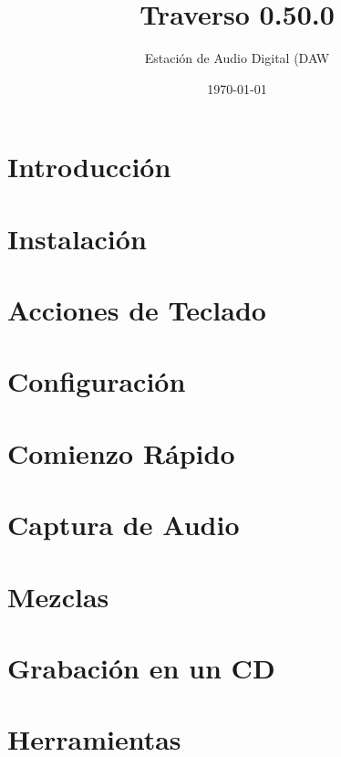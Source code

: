 \documentclass[a4paper,
               12pt,
               pdftex,
               twoside,
               smallheadings,
               headinclude,
               headsepline,
               DIV16,
               BCOR10mm,
               halfparskip
               ]{scrreprt}
\newcommand{\clearemptydoublepage}{\newpage\thispagestyle{empty}\cleardoublepage}
\begin{document}
\title{Traverso 0.50.0}
\author{Estación de Audio Digital (DAW}
\date{\today}

\begin{titlepage}
  
\end{titlepage}
  \clearemptydoublepage
  
  \clearemptydoublepage

\setcounter{page}{1}


\tableofcontents


\chapter{Introducción\label{sect_introduction}}

\chapter{Instalación\label{sect_installation}}

\chapter{Acciones de Teclado\label{sect_keyactions}}

\chapter{Configuración\label{sect_setup}}

\chapter{Comienzo Rápido\label{sect_quickstart}}

\chapter{Captura de Audio\label{sect_recording}}

\chapter{Mezclas\label{sect_mixing}}

\chapter{Grabación en un CD\label{sect_cdburning}}

\chapter{Herramientas\label{sect_tools}}

\end{document}
